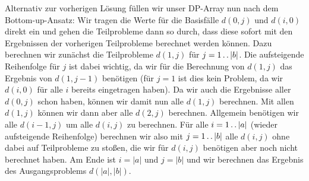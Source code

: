 \documentclass{whswinvcbook}
\begin{document}
Alternativ zur vorherigen Lösung füllen wir unser DP-Array nun nach dem Bottom-up-Ansatz: Wir tragen die Werte für die Basisfälle $d(0,j)$ und $d(i,0)$ direkt ein und gehen die Teilprobleme dann so durch, dass diese sofort mit den Ergebnissen der vorherigen Teilprobleme berechnet werden können. Dazu berechnen wir zunächst die Teilprobleme $d(1,j)$ für $j=1\mathinner{\ldotp\ldotp}|b|$. Die aufsteigende Reihenfolge für $j$ ist dabei wichtig, da wir für die Berechnung von $d(1,j)$ das Ergebnis von $d(1,j-1)$ benötigen (für $j=1$ ist dies kein Problem, da wir $d(i,0)$ für alle $i$ bereits eingetragen haben). Da wir auch die Ergebnisse aller $d(0,j)$ schon haben, können wir damit nun alle $d(1,j)$ berechnen. Mit allen $d(1,j)$ können wir dann aber alle $d(2,j)$ berechnen. Allgemein benötigen wir alle $d(i-1,j)$ um alle $d(i,j)$ zu berechnen. Für alle $i=1\mathinner{\ldotp\ldotp}|a|$ (wieder aufsteigende Reihenfolge) berechnen wir also mit $j=1\mathinner{\ldotp\ldotp}|b|$ alle $d(i,j)$ ohne dabei auf Teilprobleme zu stoßen, die wir für $d(i,j)$ benötigen aber noch nicht berechnet haben. Am Ende ist $i=|a|$ und $j=|b|$ und wir berechnen das Ergebnis des Ausgangsproblems $d(|a|,|b|)$.
\end{document}
